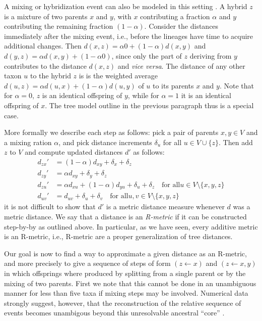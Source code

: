 \documentclass[amsmath]{lni}
\begin{document}
A mixing or hybridization event can also be modeled in this setting
\cite{Prohaska:17a}. A hybrid $z$ is a mixture of two parents $x$ and $y$,
with $x$ contributing a fraction $\alpha$ and $y$ contributing the
remaining fraction $(1-\alpha)$. Consider the distances immediately after
the mixing event, i.e., before the lineages have time to acquire additional
changes. Then $d(x,z)=\alpha 0 + (1-\alpha) d(x,y)$ and
$d(y,z) = \alpha d(x,y) + (1-\alpha 0)$, since only the part of $z$
deriving from $y$ contributes to the distance $d(x,z)$ and \textit{vice
  versa}. The distance of any other taxon $u$ to the hybrid $z$ is is the
weighted average $d(u,z)=\alpha d(u,x)+(1-\alpha) d(u,y)$ of $u$ to its
parents $x$ and $y$. Note that for $\alpha=0$, $z$ is an identical
offspring of $y$, while for $\alpha=1$ it is an identical offspring of
$x$. The tree model outline in the previous paragraph thus is a special
case.

More formally we describe each step as follows: pick a pair of parents
$x,y\in V$ and a mixing ration $\alpha$, and pick distance
increments $\delta_u$ for all $u\in V\cup\{z\}$. Then add $z$ to $V$
and compute updated distances $d'$ as follows: 
\begin{equation} 
\begin{split} 
  d_{zx}' & = (1-\alpha)  d_{xy} +\delta_x + \delta_z \\
  d_{zy}' & =   \alpha    d_{xy} +\delta_y + \delta_z  \\
  d_{zu}' & =   \alpha    d_{xu} + (1-\alpha)  d_{yu} + \delta_u + \delta_z
  \quad\textrm{for all}  u\in V\setminus\{ x,y,z \}\\
  d_{uv}' & = d_{uv}+\delta_u+\delta_v
  \quad\textrm{for all}  u,v\in V\setminus\{ x,y,z \}
\end{split}
\end{equation}
it is not difficult to show that $d'$ is a metric distance measure whenever
$d$ was a metric distance. We say that a distance is an \emph{R-metric} if
it can be constructed step-by-by as outlined above. In particular, as we
have seen, every additive metric is an R-metric, i.e., R-metric are a
proper generalization of tree distances. 

Our goal is now to find a way to approximate a given distance as an
R-metric, and more precisely to give a sequence of steps of form
$(z\leftarrow x)$ and $(z\leftarrow x,y)$ in which offsprings where
produced by splitting from a single parent or by the mixing of two
parents. First we note that this cannot be done in an unambiguous manner
for less than five taxa if mixing steps may be involved. Numerical data
strongly suggest, however, that the reconstruction of the relative sequence
of events becomes unambigous beyond this unresolvable ancestral ``core''
\cite{Prohaska:17a}. 
\end{document}
